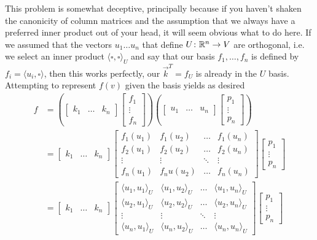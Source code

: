 \documentclass[11pt]{article}
\begin{document}
This problem is somewhat deceptive, principally because if you haven't shaken the canonicity of column matrices and the assumption that we always have a preferred inner product out of your head, it will seem obvious what to do here. If we assumed that the vectors $u_1 \dots u_n$ that define $U\colon \mathbb{R}^n \to V$ are orthogonal, i.e. we select an inner product $\langle \square, \square \rangle_U$ and say that our basis $f_1, \dots, f_n$ is defined by $f_i = \langle u_i, \square \rangle$, then this works perfectly, our $\vec k^T = f_U$ is already in the $U$ basis. Attempting to represent $f(v)$ given the basis yields as desired \begin{align*}
f &= \left( \begin{bmatrix} k_1 & \dots & k_n \end{bmatrix} \begin{bmatrix} f_1 \\ \vdots \\ f_n \end{bmatrix} \right) \left( \begin{bmatrix} u_1 & \dots & u_n \end{bmatrix} \begin{bmatrix} p_1 \\ \vdots \\ p_n \end{bmatrix} \right) \\
&= \begin{bmatrix} k_1 & \dots & k_n \end{bmatrix} \begin{bmatrix} f_1(u_1) & f_1(u_2)  & \dots & f_1 (u_n) \\ f_2(u_1) & f_2(u_2) & \dots & f_2(u_n) \\ \vdots & \vdots & \ddots & \vdots \\ f_n(u_1) & f_n u(u_2) & \dots & f_n(u_n) \end{bmatrix} \begin{bmatrix} p_1 \\ \vdots \\ p_n \end{bmatrix} \\
&= \begin{bmatrix} k_1 & \dots & k_n \end{bmatrix} \begin{bmatrix} \langle u_1,u_1 \rangle_U & \langle u_1,u_2 \rangle_U  & \dots & \langle u_1,u_n \rangle_U \\ \langle u_2,u_1 \rangle_U & \langle u_2,u_2 \rangle_U & \dots & \langle u_2,u_n \rangle_U \\ \vdots & \vdots & \ddots & \vdots \\ \langle u_n,u_1 \rangle_U & \langle u_n,u_2 \rangle_U & \dots & \langle u_n,u_n \rangle_U \end{bmatrix} \begin{bmatrix} p_1 \\ \vdots \\ p_n \end{bmatrix} \\

\end{align*}
\end{document}

